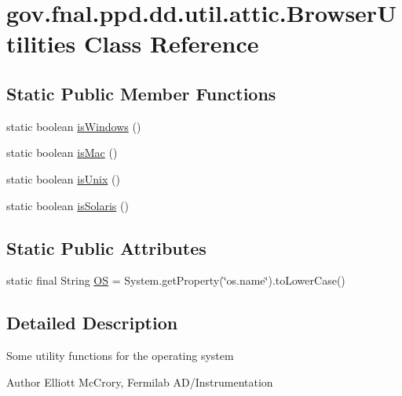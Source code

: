 \hypertarget{classgov_1_1fnal_1_1ppd_1_1dd_1_1util_1_1attic_1_1BrowserUtilities}{\section{gov.\-fnal.\-ppd.\-dd.\-util.\-attic.\-Browser\-Utilities Class Reference}
\label{classgov_1_1fnal_1_1ppd_1_1dd_1_1util_1_1attic_1_1BrowserUtilities}
}
\subsection*{Static Public Member Functions}
\begin{DoxyCompactItemize}
\item 
static boolean \hyperlink{classgov_1_1fnal_1_1ppd_1_1dd_1_1util_1_1attic_1_1BrowserUtilities_ae30062313fe48c574ac15cb28fb1651f}{is\-Windows} ()
\item 
static boolean \hyperlink{classgov_1_1fnal_1_1ppd_1_1dd_1_1util_1_1attic_1_1BrowserUtilities_a19dcb6cab2833969b50b89044eac2b8b}{is\-Mac} ()
\item 
static boolean \hyperlink{classgov_1_1fnal_1_1ppd_1_1dd_1_1util_1_1attic_1_1BrowserUtilities_a33a3ee1eab62723d028ae73a82bb0fef}{is\-Unix} ()
\item 
static boolean \hyperlink{classgov_1_1fnal_1_1ppd_1_1dd_1_1util_1_1attic_1_1BrowserUtilities_acbf52474fd6b02a88296e968c0cdd7f7}{is\-Solaris} ()
\end{DoxyCompactItemize}
\subsection*{Static Public Attributes}
\begin{DoxyCompactItemize}
\item 
static final String \hyperlink{classgov_1_1fnal_1_1ppd_1_1dd_1_1util_1_1attic_1_1BrowserUtilities_a622d3aea58a1b1d89af922808fbe6a03}{O\-S} = System.\-get\-Property(\char`\"{}os.\-name\char`\"{}).to\-Lower\-Case()
\end{DoxyCompactItemize}


\subsection{Detailed Description}
Some utility functions for the operating system

\begin{DoxyAuthor}{Author}
Elliott Mc\-Crory, Fermilab A\-D/\-Instrumentation 
\end{DoxyAuthor}


